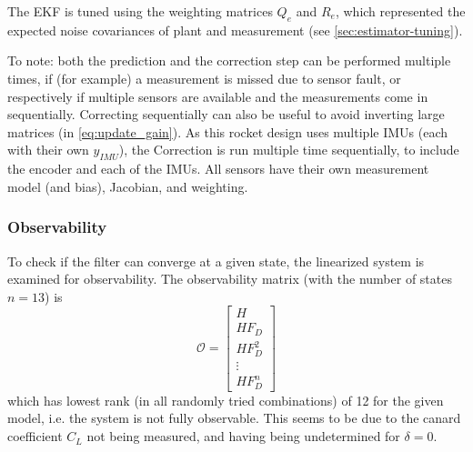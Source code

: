 The EKF is tuned using the weighting matrices $Q_e$ and $R_e$, which represented the expected noise covariances of plant and measurement (see \autoref{sec:estimator-tuning}).

To note: both the prediction and the correction step can be performed multiple times, if (for example) a measurement is missed due to sensor fault, or respectively if multiple sensors are available and the measurements come in sequentially.
Correcting sequentially can also be useful to avoid inverting large matrices (in \autoref{eq:update_gain}).
As this rocket design uses multiple IMUs (each with their own $y_{IMU}$), the Correction is run multiple time sequentially, to include the encoder and each of the IMUs.
All sensors have their own measurement model (and bias), Jacobian, and weighting.

\subsubsection{Observability}
To check if the filter can converge at a given state, the linearized system is examined for observability.
The observability matrix (with the number of states $n=13$) is 
\begin{equation}
    \mathcal{O} = \begin{bmatrix}
        H \\ H F_D \\ H F_D^2 \\ \vdots \\ H F_D^n
    \end{bmatrix}
\end{equation}
which has lowest rank (in all randomly tried combinations) of 12 for the given model, i.e. the system is not fully observable. 
This seems to be due to the canard coefficient $C_L$ not being measured, and having being undetermined for $\delta=0$.

